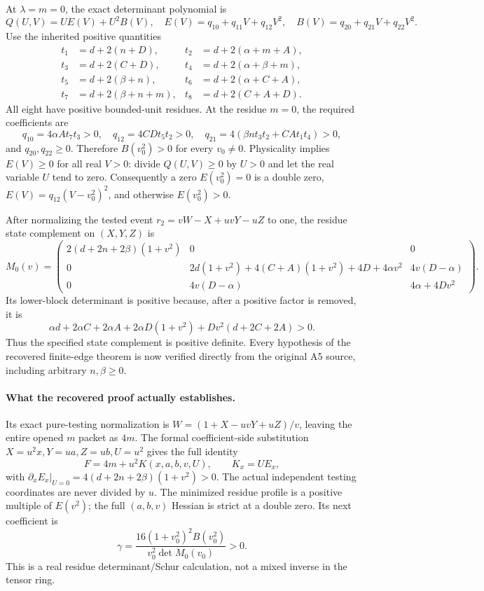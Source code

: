At $\lambda=m=0$, the exact determinant polynomial is
\[
 Q(U,V)=U E(V)+U^2 B(V),\quad
 E(V)=q_{10}+q_{11}V+q_{12}V^2,\quad
 B(V)=q_{20}+q_{21}V+q_{22}V^2.
\]
Use the inherited positive quantities
\begin{align*}
 t_1&=d+2(n+D),&t_2&=d+2(\alpha+m+A),\\
 t_3&=d+2(C+D),&t_4&=d+2(\alpha+\beta+m),\\
 t_5&=d+2(\beta+n),&t_6&=d+2(\alpha+C+A),\\
 t_7&=d+2(\beta+n+m),&t_8&=d+2(C+A+D).
\end{align*}
All eight have positive bounded-unit residues. At the residue $m=0$,
the required coefficients are
\[
 q_{10}=4\alpha A t_7t_3>0,\quad
 q_{12}=4CDt_5t_2>0,\quad
 q_{21}=4(\beta n t_3t_2+CA t_1t_4)>0,
\]
and $q_{20},q_{22}\geq0$. Therefore $B(v_0^2)>0$ for every
$v_0\ne0$. Physicality implies $E(V)\geq0$ for all real $V>0$:
divide $Q(U,V)\geq0$ by $U>0$ and let the real variable $U$ tend to
zero. Consequently a zero $E(v_0^2)=0$ is a double zero,
$E(V)=q_{12}(V-v_0^2)^2$, and otherwise $E(v_0^2)>0$.

After normalizing the tested event
$r_2=vW-X+uvY-uZ$ to one, the residue state complement on
$(X,Y,Z)$ is
\[
 M_0(v)=\begin{pmatrix}
 2(d+2n+2\beta)(1+v^2)&0&0\\
 0&2d(1+v^2)+4(C+A)(1+v^2)+4D+4\alpha v^2
                                      &4v(D-\alpha)\\
 0&4v(D-\alpha)&4\alpha+4Dv^2
 \end{pmatrix}.
\]
Its lower-block determinant is positive because, after a positive factor
is removed, it is
\[
 \alpha d+2\alpha C+2\alpha A+2\alpha D(1+v^2)
                      +Dv^2(d+2C+2A)>0.
\]
Thus the specified state complement is positive definite. Every
hypothesis of the recovered finite-edge theorem is now verified
directly from the original A5 source, including arbitrary $n,\beta\geq0$.

\paragraph{What the recovered proof actually establishes.}
Its exact pure-testing normalization is
$W=(1+X-uvY+uZ)/v$, leaving the entire opened $m$ packet as $4m$.
The formal coefficient-side substitution
$X=u^2x,Y=ua,Z=ub,U=u^2$ gives the full identity
\[
 F=4m+u^2K(x,a,b,v,U),\qquad K_x=U E_x,
\]
with $\partial_xE_x|_{U=0}=4(d+2n+2\beta)(1+v^2)>0$.
The actual independent testing coordinates are never divided by $u$.
The minimized residue profile is a positive multiple of $E(v^2)$;
the full $(a,b,v)$ Hessian is strict at a double zero. Its next
coefficient is
\[
 \gamma=\frac{16(1+v_0^2)^2 B(v_0^2)}{v_0^2\det M_0(v_0)}>0.
\]
This is a real residue determinant/Schur calculation, not a mixed
inverse in the tensor ring.

